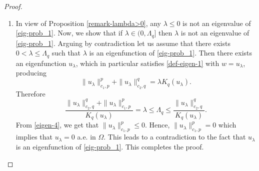 \documentclass[pdflatex,sn-mathphys-num]{sn-jnl}
\theoremstyle{thmstyleone}%
\theoremstyle{thmstyletwo}%
\theoremstyle{thmstylethree}%
\theoremstyle{thmstylethree}%
\begin{document}
\begin{proof}
\begin{enumerate}
\item[(iii)]
In view of Proposition \ref{remark-lambda>0}, any $\lambda\leqslant 0$ is not an eigenvalue of \eqref{eig-prob_1}. 
Now, we show that if $\lambda \in (0, \Lambda_q]$ then $\lambda$ is not an eigenvalue of \eqref{eig-prob_1}.  Arguing by contradiction let us assume that there exists $0<\lambda \leqslant \Lambda_q$ such that $\lambda$ is an eigenfunction of \eqref{eig-prob_1}. Then there exists an eigenfunction $u_\lambda$, which in particular satisfies \eqref{def-eigen-1} with $w=u_\lambda$, producing
\begin{equation*}\label{eigen-3}
\|u_\lambda\|_{c_1,p}^p+\|u_\lambda\|_{c_2,q}^q=\lambda K_q(u_\lambda).
 \end{equation*}
 Therefore 
\begin{equation}\label{eigen-4}
\frac{\|u_{\lambda}\|_{c_2,q}^q+\|u_{\lambda}\|_{c_1,p}^p}{K_q(u_\lambda)} =\lambda \leqslant  
\Lambda_q\leqslant \frac{\|u_\lambda \|_{c_2,q}^q}{K_q(u_\lambda )}. 
\end{equation}
From \eqref{eigen-4}, we get that $ \|u_{\lambda}\|_{c_1,p}^p\leqslant 0.$
Hence, $\|u_{\lambda}\|_{c_1,p}^p=0$ which implies that $u_{\lambda}=0$ a.e. in $\Omega$.  This leads to a contradiction to the fact that $u_{\lambda}$ is an eigenfunction of \eqref{eig-prob_1}. This completes the proof.
\end{enumerate}
\end{proof}
\end{document}
